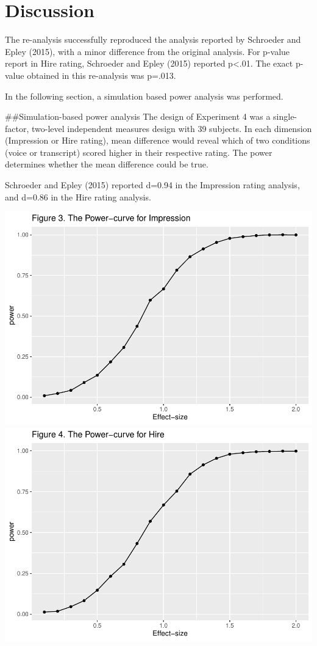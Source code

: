 \documentclass[
  english,
  man]{apa6}
\begin{document}
\hypertarget{discussion}{%
\section{Discussion}\label{discussion}}

The re-analysis successfully reproduced the analysis reported by Schroeder and Epley (2015), with a minor difference from the original analysis. For p-value report in Hire rating, Schroeder and Epley (2015) reported p\textless.01. The exact p-value obtained in this re-analysis was p=.013.

In the following section, a simulation based power analysis was performed.

\#\#Simulation-based power analysis
The design of Experiment 4 was a single-factor, two-level independent measures design with 39 subjects. In each dimension (Impression or Hire rating), mean difference would reveal which of two conditions (voice or transcript) scored higher in their respective rating. The power determines whether the mean difference could be true.

Schroeder and Epley (2015) reported d=0.94 in the Impression rating analysis, and d=0.86 in the Hire rating analysis.

\includegraphics{APAreport_files/figure-latex/unnamed-chunk-4-1.pdf} \includegraphics{APAreport_files/figure-latex/unnamed-chunk-4-2.pdf}
\end{document}
